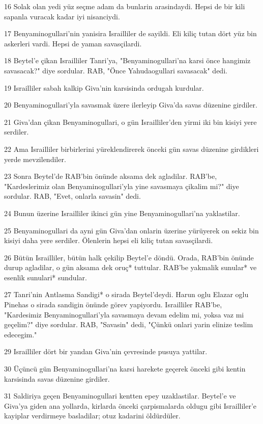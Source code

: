 \par 16 Solak olan yedi yüz seçme adam da bunlarin arasindaydi. Hepsi de bir kili sapanla vuracak kadar iyi nisanciydi.
\par 17 Benyaminogullari'nin yanisira Israilliler de sayildi. Eli kiliç tutan dört yüz bin askerleri vardi. Hepsi de yaman savasçilardi.
\par 18 Beytel'e çikan Israilliler Tanri'ya, "Benyaminogullari'na karsi önce hangimiz savasacak?" diye sordular. RAB, "Önce Yahudaogullari savasacak" dedi.
\par 19 Israilliler sabah kalkip Giva'nin karsisinda ordugah kurdular.
\par 20 Benyaminogullari'yla savasmak üzere ilerleyip Giva'da savas düzenine girdiler.
\par 21 Giva'dan çikan Benyaminogullari, o gün Israilliler'den yirmi iki bin kisiyi yere serdiler.
\par 22 Ama Israilliler birbirlerini yüreklendirerek önceki gün savas düzenine girdikleri yerde mevzilendiler.
\par 23 Sonra Beytel'de RAB'bin önünde aksama dek agladilar. RAB'be, "Kardeslerimiz olan Benyaminogullari'yla yine savasmaya çikalim mi?" diye sordular. RAB, "Evet, onlarla savasin" dedi.
\par 24 Bunun üzerine Israilliler ikinci gün yine Benyaminogullari'na yaklastilar.
\par 25 Benyaminogullari da ayni gün Giva'dan onlarin üzerine yürüyerek on sekiz bin kisiyi daha yere serdiler. Ölenlerin hepsi eli kiliç tutan savasçilardi.
\par 26 Bütün Israilliler, bütün halk çekilip Beytel'e döndü. Orada, RAB'bin önünde durup agladilar, o gün aksama dek oruç* tuttular. RAB'be yakmalik sunular* ve esenlik sunulari* sundular.
\par 27 Tanri'nin Antlasma Sandigi* o sirada Beytel'deydi. Harun oglu Elazar oglu Pinehas o sirada sandigin önünde görev yapiyordu. Israilliler RAB'be, "Kardesimiz Benyaminogullari'yla savasmaya devam edelim mi, yoksa vaz mi geçelim?" diye sordular. RAB, "Savasin" dedi, "Çünkü onlari yarin elinize teslim edecegim."
\par 29 Israilliler dört bir yandan Giva'nin çevresinde pusuya yattilar.
\par 30 Üçüncü gün Benyaminogullari'na karsi harekete geçerek önceki gibi kentin karsisinda savas düzenine girdiler.
\par 31 Saldiriya geçen Benyaminogullari kentten epey uzaklastilar. Beytel'e ve Giva'ya giden ana yollarda, kirlarda önceki çarpismalarda oldugu gibi Israilliler'e kayiplar verdirmeye basladilar; otuz kadarini öldürdüler.
